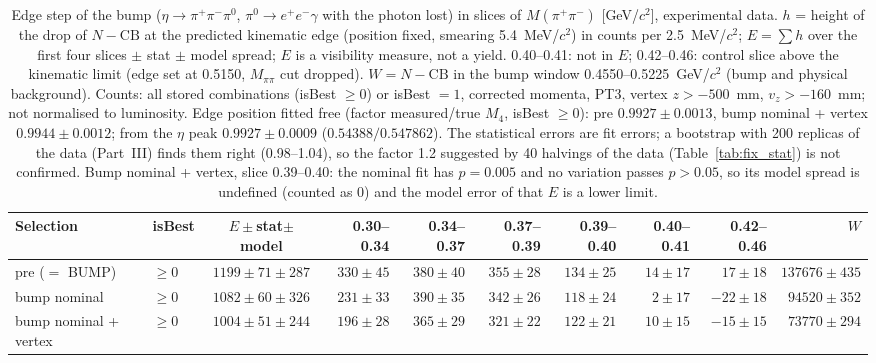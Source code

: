 \begin{table}[H]
\centering\scriptsize
\setlength{\tabcolsep}{2pt}
\caption{Edge step of the bump ($\eta\to\pi^+\pi^-\pi^0$, $\pi^0\to e^+e^-\gamma$ with the photon lost) in slices of $M(\pi^+\pi^-)$ [GeV/$c^2$], experimental data. $h$ = height of the drop of $N-\mathrm{CB}$ at the predicted kinematic edge (position fixed, smearing 5.4~MeV/$c^2$) in counts per 2.5~MeV/$c^2$; $E=\sum h$ over the first four slices $\pm$ stat $\pm$ model spread; $E$ is a visibility measure, not a yield. 0.40--0.41: not in $E$; 0.42--0.46: control slice above the kinematic limit (edge set at 0.5150, $M_{\pi\pi}$ cut dropped). $W=N-\mathrm{CB}$ in the bump window 0.4550--0.5225~GeV/$c^2$ (bump and physical background). Counts: all stored combinations (isBest $\geq0$) or isBest $=1$, corrected momenta, PT3, vertex $z>-500$~mm, $v_z>-160$~mm; not normalised to luminosity. Edge position fitted free (factor measured/true $M_4$, isBest $\geq0$): pre $0.9927\pm0.0013$, bump nominal + vertex $0.9944\pm0.0012$; from the $\eta$ peak $0.9927\pm0.0009$ ($0.54388/0.547862$). The statistical errors are fit errors; a bootstrap with 200 replicas of the data (Part~III) finds them right (0.98--1.04), so the factor 1.2 suggested by 40 halvings of the data (Table~\ref{tab:fix_stat}) is not confirmed. Bump nominal + vertex, slice 0.39--0.40: the nominal fit has $p=0.005$ and no variation passes $p>0.05$, so its model spread is undefined (counted as 0) and the model error of that $E$ is a lower limit.}
\label{tab:res_bump}
\begin{tabular}{llcrrrrrrr}
\toprule
Selection & isBest & $E\pm$stat$\pm$model & 0.30--0.34 & 0.34--0.37 & 0.37--0.39 & 0.39--0.40 & 0.40--0.41 & 0.42--0.46 & $W$ \\
\midrule
pre ($=$ BUMP) & $\geq0$ & $1199\pm71\pm287$ & $330\pm45$ & $380\pm40$ & $355\pm28$ & $134\pm25$ & $14\pm17$ & $17\pm18$ & $137676\pm435$ \\
bump nominal & $\geq0$ & $1082\pm60\pm326$ & $231\pm33$ & $390\pm35$ & $342\pm26$ & $118\pm24$ & $2\pm17$ & $-22\pm18$ & $94520\pm352$ \\
bump nominal + vertex & $\geq0$ & $1004\pm51\pm244$ & $196\pm28$ & $365\pm29$ & $321\pm22$ & $122\pm21$ & $10\pm15$ & $-15\pm15$ & $73770\pm294$ \\

\end{tabular}
\end{table}
